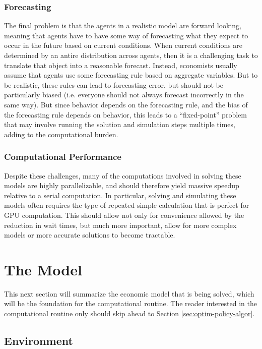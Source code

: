 \documentclass[a4paper,12pt]{article}
\numberwithin{equation}{section}
\theoremstyle{definition}
\begin{document}
\subsubsection{Forecasting}

The final problem is that the agents in a
realistic model are forward looking, meaning that agents have to have
some way of forecasting what they expect to occur in the future based
on current conditions. When current conditions are determined by an
antire distribution across agents, then it is a challenging task to
translate that object into a reasonable forecast. Instead, economists
usually assume that agents use some forecasting rule based on
aggregate variables. But to be realistic, these rules can lead to
forecasting error, but should not be particularly biased
(i.e. everyone should not always forecast incorrectly in the same
way). But since behavior depends on the forecasting rule, and the bias
of the forecasting rule depends on behavior, this leads to a
``fixed-point'' problem that may involve running the solution and
simulation steps multiple times, adding to the computational burden.

\subsubsection{Computational Performance}

Despite these challenges, many of the computations involved in solving these
models are highly parallelizable, and should therefore yield massive
speedup relative to a serial computation. In particular, solving and
simulating these models often requires the type of repeated simple
calculation that is perfect for GPU computation. This should allow not
only for convenience allowed by the reduction in wait times, but much
more important, allow for more complex models or more accurate
solutions to become tractable.

\section{The Model}

This next section will summarize the economic model that is being solved, which will be the foundation for the computational routine. The reader interested in the computational routine only should skip ahead to Section \ref{sec:optim-policy-algor}.

\subsection{Environment}
\end{document}
